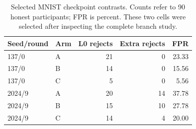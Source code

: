 \begin{table}[!t]
\centering\footnotesize
\caption{Selected MNIST checkpoint contrasts. Counts refer to 90 honest participants; FPR is percent. These two cells were selected after inspecting the complete branch study.}\label{tab:branch_cases}
\begin{tabular}{llrrr}\toprule
Seed/round & Arm & L0 rejects & Extra rejects & FPR\\\midrule
137/0 & A & 21 & 0 & 23.33 \\
137/0 & B & 14 & 0 & 15.56 \\
137/0 & C & 5 & 0 & 5.56 \\
2024/9 & A & 20 & 14 & 37.78 \\
2024/9 & B & 15 & 10 & 27.78 \\
2024/9 & C & 14 & 4 & 20.00 \\
\bottomrule\end{tabular}\end{table}

